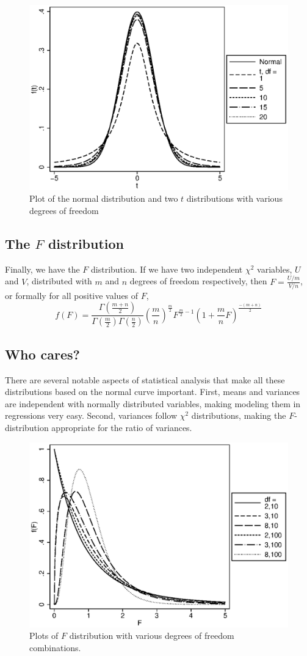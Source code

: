 \begin{figure}
   \centering
   \includegraphics[angle=0,
           width=.75\textwidth]{tdist.eps}
   \caption{Plot of the normal distribution and two $t$ distributions with various degrees of freedom}
  \label{fig:tdist}
\end{figure}

\subsection{The $F$ distribution}

Finally, we have the $F$ distribution. If we have two independent $\chi^2$ variables, $U$ and $V$, distributed with $m$ and $n$ degrees of freedom respectively, then $F=\frac{U/m}{V/n}$, or formally for all positive values of $F$,
\begin{equation}
f(F) = \frac{\Gamma\left(\frac{m+n}{2}\right)}{\Gamma\left(\frac{m}{2}\right)\Gamma\left(\frac{n}{2}\right)}\left(\frac{m}{n}\right)^{\frac{m}{2}}F^{\frac{m}{2}-1}\left(1+\frac{m}{n}F\right)^{\frac{-\left(m+n\right)}{2}}
\end{equation}
\subsection{Who cares?}
There are several notable aspects of statistical analysis that make all these distributions based on the normal curve important. First, means and variances are independent with normally distributed variables, making modeling them in regressions very easy. Second, variances follow $\chi^2$ distributions, making the $F$-distribution appropriate for the ratio of variances.


\begin{figure}
   \centering
   \includegraphics[angle=0,
           width=.75\textwidth]{f.eps}
   \caption{Plots of $F$ distribution with various degrees of freedom combinations.}
  \label{fig:f}
\end{figure}


